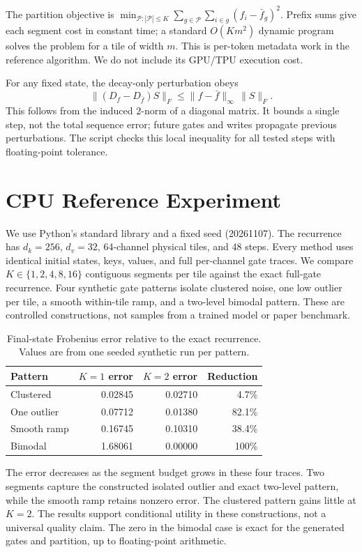 \documentclass[11pt]{article}
\begin{document}
The partition objective is $\min_{\mathcal{P}:|\mathcal{P}|\le K}\sum_{g\in\mathcal{P}}\sum_{i\in g}(f_i-\bar f_g)^2$. Prefix sums give each segment cost in constant time; a standard $O(Km^2)$ dynamic program solves the problem for a tile of width $m$. This is per-token metadata work in the reference algorithm. We do not include its GPU/TPU execution cost.

For any fixed state, the decay-only perturbation obeys
\begin{equation}
\|(D_f-D_{\bar f})S\|_F \le \|f-\bar f\|_\infty\,\|S\|_F.
\end{equation}
This follows from the induced $2$-norm of a diagonal matrix. It bounds a single step, not the total sequence error; future gates and writes propagate previous perturbations. The script checks this local inequality for all tested steps with floating-point tolerance.
\section{CPU Reference Experiment}
We use Python's standard library and a fixed seed (20261107). The recurrence has $d_k=256$, $d_v=32$, 64-channel physical tiles, and 48 steps. Every method uses identical initial states, keys, values, and full per-channel gate traces. We compare $K\in\{1,2,4,8,16\}$ contiguous segments per tile against the exact full-gate recurrence. Four synthetic gate patterns isolate clustered noise, one low outlier per tile, a smooth within-tile ramp, and a two-level bimodal pattern. These are controlled constructions, not samples from a trained model or paper benchmark.

\begin{table}[t]
\centering
\small
\begin{tabular}{lrrr}
\toprule
Pattern & $K=1$ error & $K=2$ error & Reduction \\
\midrule
Clustered & 0.02845 & 0.02710 & 4.7\% \\
One outlier & 0.07712 & 0.01380 & 82.1\% \\
Smooth ramp & 0.16745 & 0.10310 & 38.4\% \\
Bimodal & 1.68061 & 0.00000 & 100\% \\
\bottomrule
\end{tabular}
\caption{Final-state Frobenius error relative to the exact recurrence. Values are from one seeded synthetic run per pattern.}
\end{table}

The error decreases as the segment budget grows in these four traces. Two segments capture the constructed isolated outlier and exact two-level pattern, while the smooth ramp retains nonzero error. The clustered pattern gains little at $K=2$. The results support conditional utility in these constructions, not a universal quality claim. The zero in the bimodal case is exact for the generated gates and partition, up to floating-point arithmetic.
\end{document}
